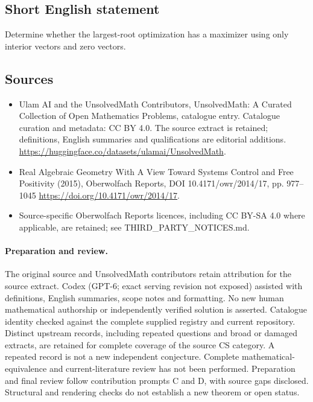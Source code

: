\documentclass[11pt]{article}
\begin{document}
\subsection{Short English statement}
Determine whether the largest-root optimization has a maximizer using only interior vectors and zero vectors.
\subsection{Sources}
\begin{itemize}
\item[\hypertarget{source:statement:1}{S1}] Ulam AI and the UnsolvedMath Contributors, UnsolvedMath: A Curated Collection of Open Mathematics Problems, catalogue entry. Catalogue curation and metadata: CC BY 4.0. The source extract is retained; definitions, English summaries and qualifications are editorial additions.
\url{https://huggingface.co/datasets/ulamai/UnsolvedMath}.
\item[\hypertarget{source:statement:2}{S2}] Real Algebraic Geometry With A View Toward Systems Control and Free Positivity (2015), Oberwolfach Reports, DOI 10.4171/owr/2014/17, pp. 977--1045
\url{https://doi.org/10.4171/owr/2014/17}.
\item Source-specific Oberwolfach Reports licences, including CC BY-SA 4.0 where applicable, are retained; see THIRD\_PARTY\_NOTICES.md.
\end{itemize}
\paragraph{Preparation and review.}
The original source and UnsolvedMath contributors retain attribution for the source extract. Codex (GPT-6; exact serving revision not exposed) assisted with definitions, English summaries, scope notes and formatting. No new human mathematical authorship or independently verified solution is asserted. Catalogue identity checked against the complete supplied registry and current repository. Distinct upstream records, including repeated questions and broad or damaged extracts, are retained for complete coverage of the source CS category. A repeated record is not a new independent conjecture. Complete mathematical-equivalence and current-literature review has not been performed. Preparation and final review follow contribution prompts C and D, with source gaps disclosed. Structural and rendering checks do not establish a new theorem or open status.
\label{end:statement}
\end{document}
